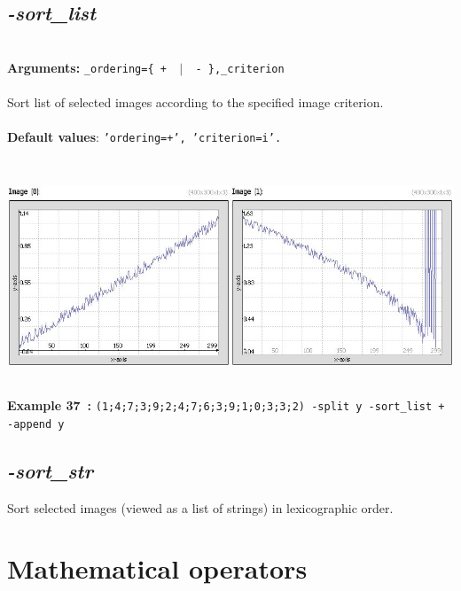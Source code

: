 \documentclass[a4paper,11pt,twoside]{book}
\begin{document}
\subsection{\emph{-sort\_list} }\vspace*{-0.5em}
~\\\textbf{Arguments: } 
{\small \texttt{\_ordering=\{ + ~$|$~ - \},\_criterion}}\\~\\
Sort list of selected images according to the specified image criterion.
~\\~\\\textbf{Default values}: {\small \texttt{'ordering=+', 'criterion=i'.}}
\begin{center}\includegraphics[keepaspectratio=true,height=7cm,width=\textwidth]{img/gmic_def37.jpg}\\
{\footnotesize \textbf{Example 37~:} \texttt{(1;4;7;3;9;2;4;7;6;3;9;1;0;3;3;2) -split y -sort\_list + -append y}}
\end{center}

\subsection{\emph{-sort\_str} }\vspace*{-0.5em}
Sort selected images (viewed as a list of strings) in lexicographic order.

\section{Mathematical operators}
\end{document}
